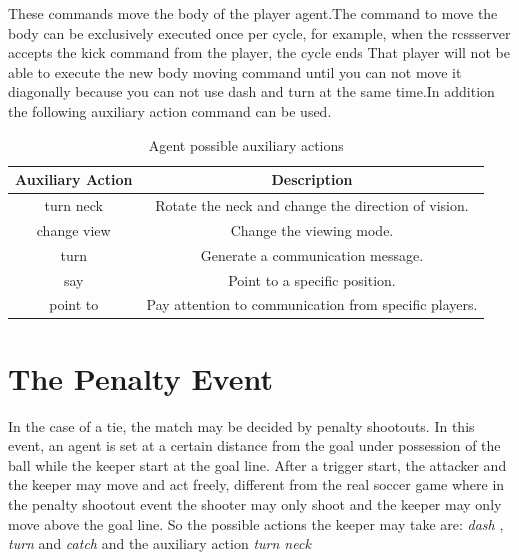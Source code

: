These commands move the body of the player agent.The command to move the body can be exclusively executed once per cycle, for example, when the rcssserver accepts the kick command from the player, the cycle ends That player will not be able  to  execute  the  new  body  moving  command  until  you  can  not  move  it diagonally because you can not use dash and turn at the same time.In addition the following auxiliary action command can be used.

\begin{table}
	\caption{Agent possible auxiliary actions}
	\label{AgentAuxiliaryActions}
	
	\center
	\begin{tabular}{cc}
		\hline
		Auxiliary Action & Description   \\
		\hline
		turn neck  & Rotate the neck and change the direction of vision.  \\
		change view  & Change the viewing mode.\\
		turn  & Generate a communication message.\\
		say & Point to a specific position.\\
		point to & Pay attention to communication from specific players.\\
		\hline
	\end{tabular}
\end{table}

\section{The Penalty Event}
In the case of a tie, the match may be decided by penalty shootouts. In this event, an agent is set at a certain distance from the goal under possession of the ball while the keeper start at the goal line. After a trigger start, the attacker and the keeper may move and act freely, different from the real soccer game where in the penalty shootout event the shooter may only shoot and the keeper may only move above the goal line. So the possible actions the keeper may take are: \textit{dash} , \textit{turn} and \textit{catch} and the auxiliary action \textit{turn neck}